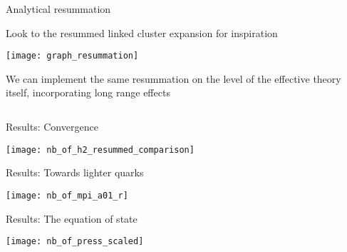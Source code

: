 \begin{frame}{Analytical resummation}

  Look to the \alert{resummed linked cluster expansion} for inspiration

  \vspace{1em}

  \begin{center}
    \texttt{[image: graph\_resummation]}
  \end{center}

  \vspace{.5em}

  We can implement the same resummation on the level of the effective theory
  itself, incorporating \alert{long range effects}

  \[
    
\]
  
\end{frame}

\begin{frame}{Results: Convergence}

\begin{center}
    \texttt{[image: nb\_of\_h2\_resummed\_comparison]}
  \end{center}
  
\end{frame}

\begin{frame}{Results: Towards lighter quarks}

  \vspace{.5cm}

  \begin{center}\hspace*{-1cm}
    \texttt{[image: nb\_of\_mpi\_a01\_r]}
  \end{center}
  
\end{frame}

\begin{frame}{Results: The equation of state}

  \vspace{.25cm}
  \begin{center}
    \texttt{[image: nb\_of\_press\_scaled]}
  \end{center}
  
\end{frame}

